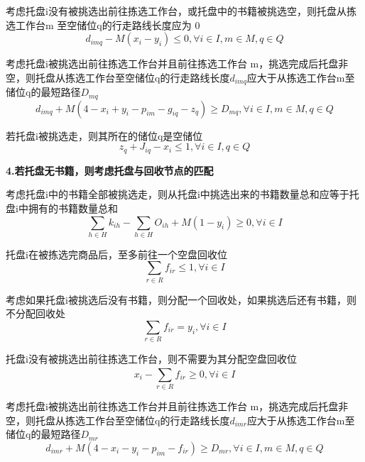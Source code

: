 \documentclass[withoutpreface,bwprint]{thesis-config}
\begin{document}
\par 考虑托盘i没有被挑选出前往拣选工作台，或托盘中的书籍被挑选空，则托盘从拣选工作台m 至空储位q的行走路线长度应为 0
\begin{equation}
   d_ {imq} -M(x_ {i}  -  y_ {i} )  \leqslant 0,  \forall  i  \in I,m  \in  M,q  \in Q
\end{equation}
\par 考虑托盘i被挑选出前往拣选工作台并且前往拣选工作台 m，挑选完成后托盘非空，则托盘从拣选工作台至空储位q的行走路线长度$d_{imq}$应大于从拣选工作台m至储位q的最短路径$D_{mq}$ 
\begin{equation}
    d_ {imq}  +M(4-  x_ {i}  +  y_ {i}  -  p_ {im}  -  g_ {iq}  -  z_ {q}  )  \geqslant  D_ {mq}  , \forall  i  \in  I,m  \in M,q  \in  Q   
\end{equation}
\par 若托盘i被挑选走，则其所在的储位q是空储位
\begin{equation}
    z_ {q}  +  J_ {iq}  -  x_ {i}  \leqslant  1,  \forall i  \in I,q  \in  Q   
\end{equation}
\par \textbf{4.若托盘无书籍，则考虑托盘与回收节点的匹配}
\par 考虑托盘i中的书籍全部被挑选走，则从托盘i中挑选出来的书籍数量总和应等于托盘i中拥有的书籍数量总和
\begin{equation}
    \sum_{h\in H}{}k_{ih} - \sum_{h \in H}{}O_{ih}+M(1-y_i)  \geqslant 0, \forall i \in I   
\end{equation}
\par 托盘i在被拣选完商品后，至多前往一个空盘回收位
\begin{equation}
    \sum_{r \in R}{}f_{ir} \le 1,\forall i \in I   
\end{equation}
\par 考虑如果托盘i被挑选后没有书籍，则分配一个回收处，如果挑选后还有书籍，则不分配回收处
\begin{equation}
    \sum_{r \in R}{}f_{ir} = y_i,\forall i \in I  
\end{equation}
\par 托盘i没有被挑选出前往拣选工作台，则不需要为其分配空盘回收位
\begin{equation}
    x_ {i}  -  \sum _ {r\in R}^ {}  f_ {ir}   \geqslant  0,  \forall  i  \in I   
\end{equation}
\par 考虑托盘i被挑选出前往拣选工作台并且前往拣选工作台 m，挑选完成后托盘非空，则托盘从拣选工作台至空储位q的行走路线长度$d_{imr}$应大于从拣选工作台m至储位q的最短路径$D_{mr}$ 
\begin{equation}
   d_ {imr}  +M(4-  x_ {i}  -  y_ {i}  -  p_ {im}  -  f_ {ir} )  \geqslant  D_ {mr}  , \forall  i  \in  I,m  \in M,q  \in  Q
\end{equation}
\end{document}
